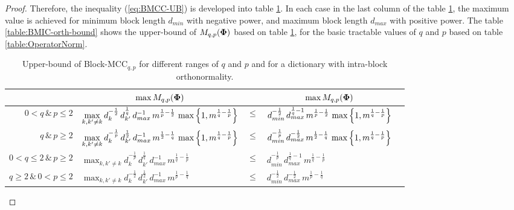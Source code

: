 \begin{proof}
Therefore, the inequality (\ref{eq:BMCC-UB}) is developed into table \ref{table:BMCC_UpperBound}.
In each case in the last column of the table \ref{table:BMCC_UpperBound}, the maximum value is achieved for minimum block length $d_{min}$ with negative power, and maximum block length $d_{max}$ with positive power.
The table \ref{table:BMIC-orth-bound} shows the upper-bound of $M_{q,p}(\boldsymbol{\Phi})$ based on table \ref{table:BMCC_UpperBound}, for the basic tractable values of $q$ and $p$ based on table \ref{table:OperatorNorm}. 
\begin{table}[tp]
\begin{adjustbox}{width=1\textwidth} %
\centering
\begin{tabular}{ccccc}
\toprule
\multicolumn{1}{c}{} & \multicolumn{1}{c}{$\max M_{q,p}(\boldsymbol{\Phi})$} & \multicolumn{1}{c}{ } & \multicolumn{1}{c}{$\max M_{q,p}(\boldsymbol{\Phi})$} \\ \midrule %
\multicolumn{1}{r}{${0 < q\, \& \, p \leq 2}$} & \multicolumn{1}{l}{$\displaystyle\max_{k,k' \neq k} d_{k}^{-\frac12} \, d_{k'}^{\frac1q} \, d_{max}^{-1} \, m^{\frac1p - \frac12} \, \max \left\lbrace 1 , m^{\frac1q - \frac1p} \right\rbrace$} & \multicolumn{1}{l}{$\leq$} & \multicolumn{1}{l}{$d_{min}^{-\frac12} \, d_{max}^{\frac1q - 1} \, m^{\frac1p - \frac12} \, \max \left\lbrace 1 , m^{\frac1q - \frac1p} \right\rbrace$}  \\ 
\multicolumn{1}{r}{${q\, \& \, p \geq 2}$} & \multicolumn{1}{l}{$\displaystyle\max_{k,k' \neq k} d_{k}^{-\frac1p} \, d_{k'}^{\frac12} \, d_{max}^{-1} \, m^{\frac12 - \frac1q} \, \max \left\lbrace 1 , m^{\frac1q - \frac1p} \right\rbrace$} & \multicolumn{1}{l}{$\leq$} & \multicolumn{1}{l}{$d_{min}^{-\frac1p} \, d_{max}^{-\frac12} \, m^{\frac12 - \frac1q} \, \max \left\lbrace 1 , m^{\frac1q - \frac1p} \right\rbrace$}  \\
\multicolumn{1}{r}{${0 < q \leq 2\, \& \, p \geq 2}$} & \multicolumn{1}{l}{$\displaystyle\max_{k,k' \neq k} d_{k}^{-\frac1p} \, d_{k'}^{\frac1q} \, d_{max}^{-1} \, m^{\frac1q - \frac1p}$}  & \multicolumn{1}{l}{$\leq$} & \multicolumn{1}{l}{$d_{min}^{-\frac1p} \, d_{max}^{\frac1q - 1} \, m^{\frac1q - \frac1p}$}  \\ 
\multicolumn{1}{r}{${q \geq 2\, \& \, 0 < p \leq 2}$} & \multicolumn{1}{l}{$\displaystyle\max_{k,k' \neq k} d_{k}^{-\frac12} \, d_{k'}^{\frac12} \, d_{max}^{-1} \, m^{\frac1p - \frac1q}$}  & \multicolumn{1}{l}{$\leq$} & \multicolumn{1}{l}{$d_{min}^{-\frac12} \, d_{max}^{-\frac12} \, m^{\frac1p - \frac1q}$} \\
\bottomrule %
\end{tabular}
\end{adjustbox}
\caption{Upper-bound of Block-MCC$_{q,p}$ for different ranges of $q$ and $p$ and for a dictionary with intra-block orthonormality.}
\label{table:BMCC_UpperBound}
\end{table}
\end{proof}